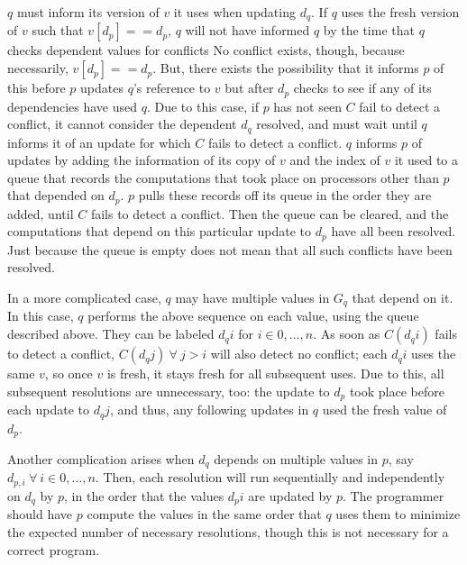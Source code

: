 $q$ must inform its version of $v$ it uses when updating $d_q$. If $q$ uses the
fresh version of $v$ such that $v[d_p] == d_p$, $q$ will not have informed $q$
by the time that $q$ checks dependent values for conflicts No conflict exists,
though, because necessarily, $v[d_p] == d_p$. But, there exists the 
possibility that it informs $p$ of this before $p$ updates $q$'s reference to
$v$ but after $d_p$ checks to see if any of its dependencies have used $q$. Due
to this case, if $p$ has not seen $C$ fail to detect a conflict, it cannot
consider the dependent $d_q$ resolved, and must wait until $q$ informs it of an
update for which $C$ fails to detect a conflict. $q$ informs $p$ of updates by
adding the information of its copy of $v$ and the index of $v$ it used to a
queue that records the computations that took place on processors other than $p$
that depended on $d_p$. $p$ pulls these records off its queue in the order they
are added, until $C$ fails to detect a conflict. Then the queue can be cleared,
and the computations that depend on this particular update to $d_p$ have all
been resolved. Just because the queue is empty does not mean that all such
conflicts have been resolved.

In a more complicated case, $q$ may have multiple values in $G_q$ that depend on
it. In this case, $q$ performs the above sequence on each value, using the queue
described above. They can be labeled $d_qi$ for $i \in 0, \dots, n$. As soon as
$C(d_qi)$ fails to detect a conflict, $C(d_qj) ~ \forall ~ j > i $ will also detect
no conflict; each $d_qi$ uses the same $v$, so once $v$ is fresh, it stays fresh
for all subsequent uses. Due to this, all subsequent resolutions are
unnecessary, too: the update to $d_p$ took place before each update to $d_qj$,
and thus, any following updates in $q$ used the fresh value of $d_p$.

Another complication arises when $d_q$ depends on multiple values in $p$, say
$d_{p,i} ~ \forall ~ i \in 0, \dots, n$. Then, each resolution will run sequentially
and independently on $d_q$ by $p$, in the order that the values $d_pi$ are
updated by $p$. The programmer should have $p$ compute the values in the same
order that $q$ uses them to minimize the expected number of necessary
resolutions, though this is not necessary for a correct program.

